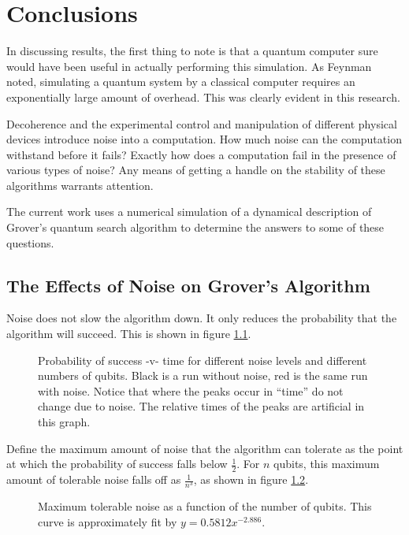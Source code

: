 
\chapter{Conclusions}
\label{chap:conclusion}
%


In discussing results, the first thing to note is that
a quantum computer sure would have been useful in actually
performing this simulation.
As Feynman noted\cite{Feynman:82}, simulating a quantum system
by a classical computer requires an exponentially large amount
of overhead.  This was clearly evident in this research.

Decoherence and the 
experimental control and manipulation of different 
physical devices introduce noise into a computation.  
How much noise can the computation withstand before
it fails?  Exactly how does a computation fail in the
presence of various types of noise?
Any means of getting a handle
on the stability of these algorithms warrants attention.

The current work uses a numerical simulation of
a dynamical description of Grover's quantum search
algorithm to determine the answers to some of these
questions.

\pagebreak
\section{The Effects of Noise on Grover's Algorithm}

Noise does not slow the algorithm down.  It only reduces the
probability that the algorithm will succeed.  This is shown in 
figure \ref{fig:humps}.
\begin{figure}[h]
\begin{center}
\end{center}
\caption{Probability of success -v- time for different noise levels and different numbers
of qubits.  Black is a run without noise, red is the same run with noise.  Notice that
where the peaks occur in ``time'' do not change due to noise.  The relative times of the
peaks are artificial in this graph.}
\label{fig:humps}
\end{figure}

\pagebreak

\noindent
Define the maximum amount of noise that the algorithm can tolerate
as the point at which the probability of success falls below $\frac{1}{2}$.
For $n$ qubits,
this maximum amount of tolerable noise falls off as $\frac{1}{n^3}$, 
as shown in figure \ref{fig:results}.
\begin{figure}[h]
\begin{center}
\end{center}
\caption{Maximum tolerable noise as a function of the number of qubits.
This curve is approximately fit by $y = 0.5812 x^{-2.886}$.}
\label{fig:results}
\end{figure}

